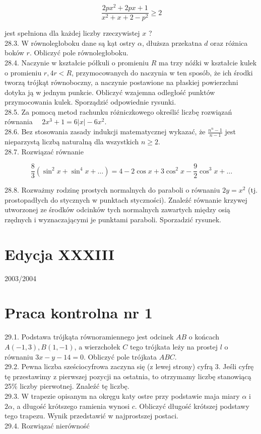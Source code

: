 \documentclass[10pt]{article}
\begin{document}
$$
\frac{2 p x^{2}+2 p x+1}{x^{2}+x+2-p^{2}} \geq 2
$$

jest spełniona dla każdej liczby rzeczywistej $x$ ?\\
28.3. W równoległoboku dane są kạt ostry $\alpha$, dłuższa przekatna $d$ oraz różnica boków $r$. Obliczyć pole równoległoboku.\\
28.4. Naczynie w kształcie półkuli o promieniu $R$ ma trzy nóźki w kształcie kulek o promieniu $r, 4 r<R$, przymocowanych do naczynia w ten sposób, że ich środki tworzą trójkąt równoboczny, a naczynie postawione na płaskiej powierzchni dotyka ją w jednym punkcie. Obliczyć wzajemna odległość punktów przymocowania kulek. Sporządzić odpowiednie rysunki.\\
28.5. Za pomocą metod rachunku różniczkowego określić liczbę rozwiązań równania $\quad 2 x^{3}+1=6|x|-6 x^{2}$.\\
28.6. Bez stosowania zasady indukcji matematycznej wykazać, że $\frac{n^{n}-1}{n-1}$ jest nieparzystą liczbą naturalną dla wszystkich $n \geq 2$.\\
28.7. Rozwiązać równanie

$$
\frac{8}{3}\left(\sin ^{2} x+\sin ^{4} x+\ldots\right)=4-2 \cos x+3 \cos ^{2} x-\frac{9}{2} \cos ^{3} x+\ldots
$$

28.8. Rozważmy rodzinę prostych normalnych do paraboli o równaniu $2 y=x^{2}$ (tj. prostopadłych do stycznych w punktach styczności). Znaleźć równanie krzywej utworzonej ze środków odcinków tych normalnych zawartych między osią rzędnych i wyznaczającymi je punktami paraboli. Sporzadzić rysunek.

\section*{Edycja XXXIII}
2003/2004

\section*{Praca kontrolna nr 1}
29.1. Podstawa trójkąta równoramiennego jest odcinek $A B$ o końcach $A(-1,3), B(1,-1)$, a wierzchołek $C$ tego trójkata leży na prostej $l$ o równaniu $3 x-y-14=0$. Obliczyć pole trójkata $A B C$.\\
29.2. Pewna liczba sześciocyfrowa zaczyna się (z lewej strony) cyfrą 3. Jeśli cyfrę tę przestawimy z pierwszej pozycji na ostatnia, to otrzymamy liczbę stanowiącą 25\% liczby pierwotnej. Znaleźć tę liczbę.\\
29.3. W trapezie opisanym na okręgu katy ostre przy podstawie maja miary $\alpha$ i $2 \alpha$, a długość krótszego ramienia wynosi $c$. Obliczyć długość krótszej podstawy tego trapezu. Wynik przedstawić w najprostszej postaci.\\
29.4. Rozwiązać nierówność
\end{document}
